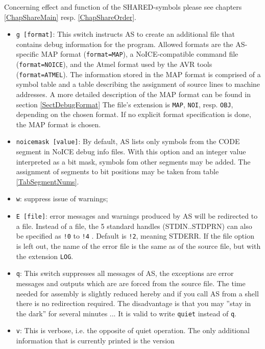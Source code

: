 \documentclass[12pt,twoside]{report}
\newcommand{\tty}[1]{{\tt #1}}
\newcommand{\asname}{{AS}}
\begin{document}
Concerning effect and function of the SHARED-symbols please see
chapters \ref{ChapShareMain} resp. \ref{ChapShareOrder}.
\begin{itemize}
\item{\tty{g [format]}: This switch instructs \asname{} to create an additional
      file that contains debug information for the program.  Allowed
      formats are the \asname{}-specific MAP format ({\tt format=MAP}), a
      NoICE-compatible command file ({\tt format=NOICE}), and the Atmel
      format used by the AVR tools ({\tt format=ATMEL}). The information
      stored in the MAP format is comprised of a symbol table and a table
      describing the assignment of source lines to machine addresses.  A
      more detailed description of the MAP format can be found in section
      \ref{SectDebugFormat}  The file's extension is \tty{MAP}, \tty{NOI},
      resp. \tty{OBJ}, depending on the chosen format.  If no explicit
      format specification is done, the MAP format is chosen.}
\item{\tty{noicemask [value]}: By default, \asname{} lists only symbols from the
      CODE segment in NoICE debug info files.  With this option and an
      integer value interpreted as a bit mask, symbols fom other segments
      may be added.  The assignment of segments to bit positions may
      be taken from table \ref{TabSegmentNums}.}
\item{\tty{w}: suppress issue of warnings;}
\item{\tty{E [file]}: error messages and warnings produced by \asname{} will be
      redirected to a file. Instead of a file, the 5 standard
      handles (STDIN..STDPRN) can also be specified as
      \tty{!0} to \tty{!4} . Default is \tty{!2}, meaning STDERR.  If the
      file option is left out, the name of the error file
      is the same as of the source file, but with the
      extension \tty{LOG}.}
\item{\tty{q}: This switch suppresses all messages of \asname{}, the exceptions are
      error messages and outputs which are are forced from the
      source file.  The time needed for assembly is slightly reduced
      hereby and if you call \asname{} from a shell there is no redirection
      required.  The disadvantage is that you may ''stay in the dark''
      for several minutes ... It is valid to write \tty{quiet} instead
      of \tty{q}.}
\item{\tty{v}: This is verbose, i.e. the opposite of quiet operation.  The
      only additional information that is currently printed is the version
}
\end{itemize}
\end{document}
